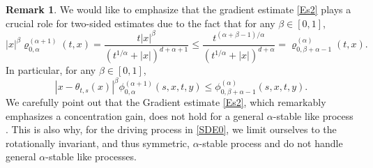 \documentclass[JEP,XML,SOM,Unicode,published]{cedram}
\theoremstyle{plain}
\theoremstyle{definition}
\newtheorem{remark}[theorem]{Remark}
\newcommand\1{{\mathbf{1}}}
\begin{document}
\begin{remark}\rm \label{IMP_REM}
We would like to emphasize that the gradient estimate \eqref{Es2} plays a crucial role for two-sided estimates due to the fact
that for any $\beta\in[0,1]$,
\[
|x|^\beta\varrho^{(\alpha+1)}_{0,\alpha}(t,x)=\frac{t|x|^\beta}{(t^{1/\alpha}+|x|)^{d+\alpha+1}}
\leq\frac{t^{(\alpha+\beta-1)/\alpha}}{(t^{1/\alpha}+|x|)^{d+\alpha}}=\varrho^{(\alpha)}_{0,\beta+\alpha-1}(t,x).
\]
In particular, for any $\beta\in[0,1]$,
\begin{equation}\label{AA1}
|x-\theta_{t,s}(x)|^\beta\phi^{(\alpha+1)}_{0,\alpha}(s,x,t,y)
\leq\phi^{(\alpha)}_{0,\beta+\alpha-1}(s,x,t,y).
\end{equation}
We carefully point out that the Gradient estimate \eqref{Es2}, which remarkably emphasizes a concentration gain, does not hold for a general $\alpha$-stable like process \cite{DZ}. This is also why, for the driving process in \eqref{SDE0}, we limit
ourselves to the rotationally invariant, and thus symmetric,
$\alpha$-stable process and do not handle general $\alpha$-stable like processes.
\end{remark}
\end{document}
